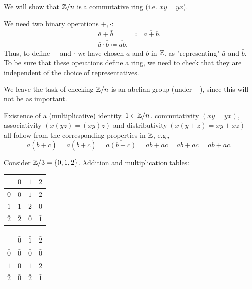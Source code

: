 \documentclass[10pt, a4paper]{article}
\begin{document}
\begin{example}
    We will show that $\mathbb{Z} / n$ is a commutative ring
    (i.e. $xy = yx$).

    \begin{solution}
        We need two binary operations $+, \cdot$:
        \begin{align*}
            \bar{a} + \bar{b} &\coloneqq \overline{a + b}. \\
            \bar{a} \cdot \bar{b} \coloneqq \overline{ab}.
        \end{align*}
        Thus,
        to define $+$ and $\cdot$ we have chosen $a$ and $b$ in $\mathbb{Z}$,
        as "representing" $\bar{a}$ and $\bar{b}$.
        To be sure that these operations define a ring,
        we need to check that they are independent of the choice of representatives.

        We leave the task of checking $\mathbb{Z} / n$ is an abelian group
        (under $+$),
        since this will not be as important.

        Existence of a
        (multiplicative)
        identity.
        $\bar{1} \in \mathbb{Z} / n$.
        commutativity $(xy = yx)$,
        associativity $(x(yz) = (xy)z)$ and distributivity $(x(y + z) = xy + xz)$ all follow from the corresponding properties in $\mathbb{Z}$,
        e.g.,
        \[
        \bar{a}(\bar{b} + \bar{c}) = \bar{a}(\overline{b + c}) = \overline{a(b + c)} = \overline{ab + ac} = \overline{ab} + \overline{ac} = \bar{a}\bar{b} + \bar{a}\bar{c}.
        \]
    \end{solution}
\end{example}

\begin{example}
    Consider $\mathbb{Z} / 3 = \{\bar{0}, \bar{1}, \bar{2}\}$.
    Addition and multiplication tables:
    
    \begin{table}[h!]
        \begin{tabular}{c|c|c|c}
            & $\bar{0}$ & $\bar{1}$ & $\bar{2}$ \\
            \hline
             $\bar{0}$ & $\bar{0}$ & $\bar{1}$ & $\bar{2}$ \\
             $\bar{1}$ & $\bar{1}$ & $\bar{2}$ & $\bar{0}$ \\
             $\bar{2}$ & $\bar{2}$ & $\bar{0}$ & $\bar{1}$
        \end{tabular}
    \end{table}
    
    \begin{table}[h!]
        \begin{tabular}{c|c|c|c}
            & $\bar{0}$ & $\bar{1}$ & $\bar{2}$ \\
            \hline
             $\bar{0}$ & $\bar{0}$ & $\bar{0}$ & $\bar{0}$ \\
             $\bar{1}$ & $\bar{0}$ & $\bar{1}$ & $\bar{2}$ \\
             $\bar{2}$ & $\bar{0}$ & $\bar{2}$ & $\bar{1}$
        \end{tabular}
    \end{table}
\end{example}
\end{document}
